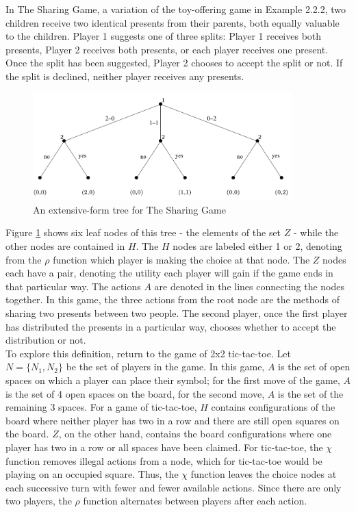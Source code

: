 \begin{exmp}
  In The Sharing Game, a variation of the toy-offering game in Example 2.2.2, two children receive two identical presents from their parents, both equally valuable to the children. Player 1 suggests one of three splits: Player 1 receives both presents, Player 2 receives both presents, or each player receives one present. Once the split has been suggested, Player 2 chooses to accept the split or not. If the split is declined, neither player receives any presents.

  \begin{figure}[H]
    \centering
    \includegraphics[width=10cm]{figures/ExampleTree.png}
    \caption{An extensive-form tree for The Sharing Game \cite{shoh09}}
    \label{fig:sharingTree}
  \end{figure}
\end{exmp}

Figure \ref{fig:sharingTree} shows six leaf nodes of this tree - the elements of the set $Z$ - while the other nodes are contained in $H$. The $H$ nodes are labeled either 1 or 2, denoting from the $\rho$ function which player is making the choice at that node. The $Z$ nodes each have a pair, denoting the utility each player will gain if the game ends in that particular way. The actions $A$ are denoted in the lines connecting the nodes together. In this game, the three actions from the root node are the methods of sharing two presents between two people. The second player, once the first player has distributed the presents in a particular way, chooses whether to accept the distribution or not.\\

To explore this definition, return to the game of 2x2 tic-tac-toe. Let $N=\{N_1, N_2\}$ be the set of players in the game. In this game, $A$ is the set of open spaces on which a player can place their symbol; for the first move of the game, $A$ is the set of 4 open spaces on the board, for the second move, $A$ is the set of the remaining 3 spaces. For a game of tic-tac-toe, $H$ contains configurations of the board where neither player has two in a row and there are still open squares on the board. $Z$, on the other hand, contains the board configurations where one player has two in a row or all spaces have been claimed. For tic-tac-toe, the $\chi$ function removes illegal actions from a node, which for tic-tac-toe would be playing on an occupied square. Thus, the $\chi$ function leaves the choice nodes at each successive turn with fewer and fewer available actions. Since there are only two players, the $\rho$ function alternates between players after each action.

